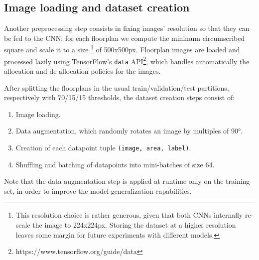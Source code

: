 \subsection{Image loading and dataset creation}\label{sec:dataset_creation} %
\noindent
Another preprocessing step consists in fixing images' resolution so that they can be fed to the CNN: for each floorplan we compute the minimum circumscribed square and scale it to a size \footnote{This resolution choice is rather generous, given that both CNNs internally re-scale the image to 224x224px. Storing the dataset at a higher resolution leaves some margin for future experiments with different models.} of 500x500px. 
Floorplan images are loaded and processed lazily using TensorFlow's \texttt{data} API\footnote{https://www.tensorflow.org/guide/data}, which handles automatically the allocation and de-allocation policies for the images. 

After splitting the floorplans in the usual train/validation/test partitions, respectively with 70/15/15 thresholds, the dataset creation steps consist of:
\begin{enumerate}
    \item Image loading.
    \item Data augmentation, which randomly rotates an image by multiples of 90°.
    \item Creation of each datapoint tuple \texttt{(image, area, label)}.
    \item Shuffling and batching of datapoints into mini-batches of size 64.
\end{enumerate}
Note that the data augmentation step is applied at runtime only on the training set, in order to improve the model generalization capabilities.
